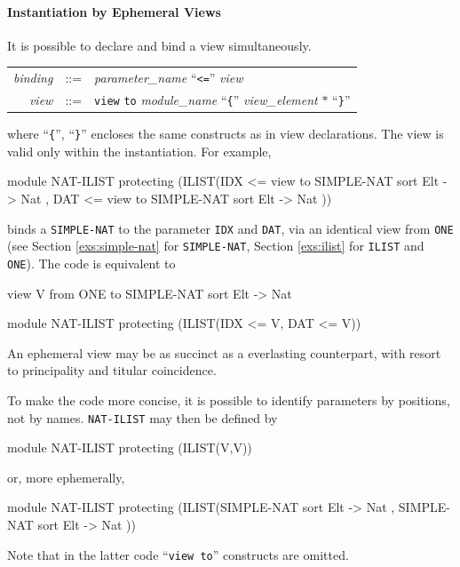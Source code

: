 \documentclass[a4paper]{memoir}
\begin{document}
\paragraph{Instantiation by Ephemeral Views}

It is possible to declare and bind a view simultaneously.

\begin{tabular}{r c l}\index{\texttt{view}}\index{\texttt{to}}
  \textit{binding} &::=& \textit{parameter\_name} ``\verb|<=|'' \textit{view} \\
  \textit{view} &::=& \verb|view| \verb|to| \textit{module\_name}
     ``\verb|{|'' \textit{view\_element} $*$ ``\verb|}|''
\end{tabular}

where ``\verb|{|'', ``\verb|}|'' encloses the same constructs as in view
declarations. The view is valid only within the instantiation.
For example,\label{exs:nat-ilist}
\begin{vvtm}
\begin{ccode}
   module NAT-ILIST {
     protecting (ILIST(IDX <= view to SIMPLE-NAT { sort Elt -> Nat },
                       DAT <= view to SIMPLE-NAT { sort Elt -> Nat }))
   }
\end{ccode}
\end{vvtm}
binds a \verb|SIMPLE-NAT| to the parameter \verb|IDX| and \verb|DAT|,
via an identical view from \verb|ONE| (see Section \ref{exs:simple-nat} for
\verb|SIMPLE-NAT|, Section \ref{exs:ilist} for
\verb|ILIST| and \verb|ONE|). The code is equivalent to
\begin{vvtm}
\begin{ccode}
  view V from ONE to SIMPLE-NAT { sort Elt -> Nat }

  module NAT-ILIST {
    protecting (ILIST(IDX <= V, DAT <= V))
  }
\end{ccode}
\end{vvtm}
An ephemeral view may be as succinct as a everlasting counterpart, with
resort to principality and titular coincidence.

To make the code more concise, it is possible to identify parameters
by positions, not by names. \verb|NAT-ILIST| may then be defined by
\begin{vvtm}
\begin{ccode}
  module NAT-ILIST {
    protecting (ILIST(V,V))
  }
\end{ccode}
\end{vvtm}
or, more ephemerally,
\begin{vvtm}
\begin{ccode}
  module NAT-ILIST {
    protecting (ILIST(SIMPLE-NAT { sort Elt -> Nat },
                      SIMPLE-NAT { sort Elt -> Nat }))
  }
\end{ccode}
\end{vvtm}
Note that in the latter code ``\verb|view to|'' constructs are omitted.
\end{document}
